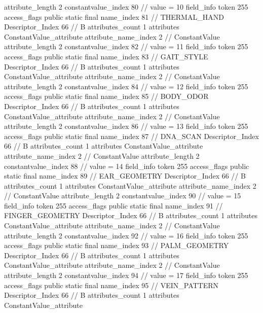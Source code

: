 {{{{{{{					attribute_length	2
					constantvalue_index	80		// value = 10
				}
				}
			}
			field_info {
				token	255
				access_flags	public static final
				name_index	81		// THERMAL_HAND
				Descriptor_Index	66		// B
				attributes_count	1
				attributes {
				ConstantValue_attribute {
					attribute_name_index	2		// ConstantValue
					attribute_length	2
					constantvalue_index	82		// value = 11
				}
				}
			}
			field_info {
				token	255
				access_flags	public static final
				name_index	83		// GAIT_STYLE
				Descriptor_Index	66		// B
				attributes_count	1
				attributes {
				ConstantValue_attribute {
					attribute_name_index	2		// ConstantValue
					attribute_length	2
					constantvalue_index	84		// value = 12
				}
				}
			}
			field_info {
				token	255
				access_flags	public static final
				name_index	85		// BODY_ODOR
				Descriptor_Index	66		// B
				attributes_count	1
				attributes {
				ConstantValue_attribute {
					attribute_name_index	2		// ConstantValue
					attribute_length	2
					constantvalue_index	86		// value = 13
				}
				}
			}
			field_info {
				token	255
				access_flags	public static final
				name_index	87		// DNA_SCAN
				Descriptor_Index	66		// B
				attributes_count	1
				attributes {
				ConstantValue_attribute {
					attribute_name_index	2		// ConstantValue
					attribute_length	2
					constantvalue_index	88		// value = 14
				}
				}
			}
			field_info {
				token	255
				access_flags	public static final
				name_index	89		// EAR_GEOMETRY
				Descriptor_Index	66		// B
				attributes_count	1
				attributes {
				ConstantValue_attribute {
					attribute_name_index	2		// ConstantValue
					attribute_length	2
					constantvalue_index	90		// value = 15
				}
				}
			}
			field_info {
				token	255
				access_flags	public static final
				name_index	91		// FINGER_GEOMETRY
				Descriptor_Index	66		// B
				attributes_count	1
				attributes {
				ConstantValue_attribute {
					attribute_name_index	2		// ConstantValue
					attribute_length	2
					constantvalue_index	92		// value = 16
				}
				}
			}
			field_info {
				token	255
				access_flags	public static final
				name_index	93		// PALM_GEOMETRY
				Descriptor_Index	66		// B
				attributes_count	1
				attributes {
				ConstantValue_attribute {
					attribute_name_index	2		// ConstantValue
					attribute_length	2
					constantvalue_index	94		// value = 17
				}
				}
			}
			field_info {
				token	255
				access_flags	public static final
				name_index	95		// VEIN_PATTERN
				Descriptor_Index	66		// B
				attributes_count	1
				attributes {
				ConstantValue_attribute {
}}}}}}}
